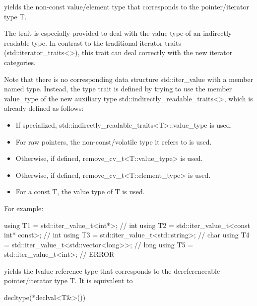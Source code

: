 yields the non-const value/element type that corresponds to the pointer/iterator type T.

The trait is especially provided to deal with the value type of an indirectly readable type. In contrast to the traditional iterator traits (std::iterator\_traits<>), this trait can deal correctly with the new iterator categories.

Note that there is no corresponding data structure std::iter\_value with a member named type. Instead, the type trait is defined by trying to use the member value\_type of the new auxiliary type std::indirectly\_readable\_traits<>, which is already defined as follows:

\begin{itemize}
\item 
If specialized, std::indirectly\_readable\_traits<T>::value\_type is used.

\item 
For raw pointers, the non-const/volatile type it refers to is used.

\item 
Otherwise, if defined, remove\_cv\_t<T::value\_type> is used.

\item 
Otherwise, if defined, remove\_cv\_t<T::element\_type> is used.

\item 
For a const T, the value type of T is used.
\end{itemize}

For example:

\begin{cpp}
using T1 = std::iter_value_t<int*>; // int
using T2 = std::iter_value_t<const int* const>; // int
using T3 = std::iter_value_t<std::string>; // char
using T4 = std::iter_value_t<std::vector<long>>; // long
using T5 = std::iter_value_t<int>; // ERROR
\end{cpp}



yields the lvalue reference type that corresponds to the dereferenceable pointer/iterator type T. It is equivalent to

\begin{cpp}
decltype(*declval<T&>())
\end{cpp}



